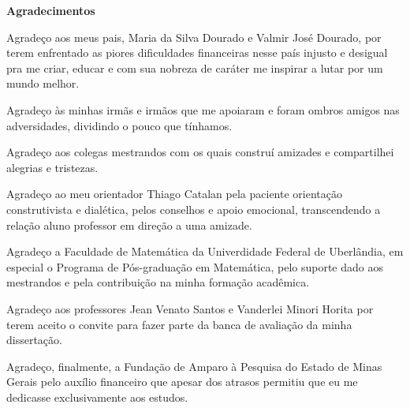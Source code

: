 %

\vspace*{3cm}

\begin{center}
{\LARGE \textbf{Agradecimentos}}
\end{center}

\vspace{3cm}

Agradeço aos meus pais, Maria da Silva Dourado e Valmir José Dourado, por terem enfrentado as piores dificuldades financeiras nesse país injusto e desigual pra me criar, educar e com sua nobreza de caráter me inspirar a lutar por um mundo melhor.

Agradeço às minhas irmãs e irmãos que me apoiaram e foram ombros amigos nas adversidades, dividindo o pouco que tínhamos.

Agradeço aos colegas mestrandos com os quais construí amizades e compartilhei alegrias e tristezas.

Agradeço ao meu orientador Thiago Catalan pela paciente orientação construtivista e dialética, pelos conselhos e apoio emocional, transcendendo a relação aluno professor em direção a uma amizade.

Agradeço a Faculdade de Matemática da Univerdidade Federal de Uberlândia, em especial o Programa de Pós-graduação em Matemática, pelo suporte dado aos mestrandos e pela contribuição na minha formação acadêmica.

Agradeço aos professores Jean Venato Santos e Vanderlei Minori Horita por terem aceito o convite para fazer parte da banca de avaliação da minha dissertação.

Agradeço, finalmente, a Fundação de Amparo à Pesquisa do Estado de Minas Gerais pelo auxílio financeiro que apesar dos atrasos permitiu que eu me dedicasse exclusivamente aos estudos.

%

\newpage